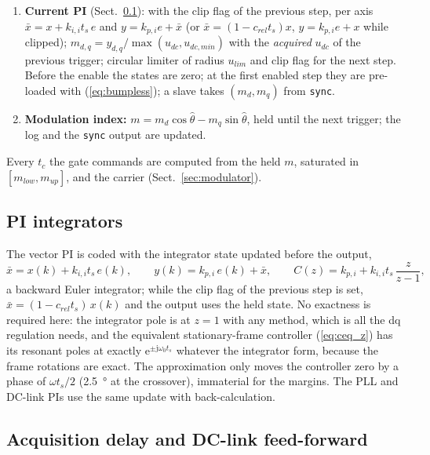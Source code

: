 \documentclass[10pt,a4paper]{scrartcl}
\newcommand{\ts}{t_s}
\newcommand{\tc}{t_c}
\newcommand{\wo}{\omega_0}
\newcommand{\kpi}{k_{p,i}}
\newcommand{\kii}{k_{i,i}}
\newcommand{\jj}{\mathrm{j}}
\newcommand{\ee}{\mathrm{e}}
\newcommand{\code}[1]{\texttt{#1}}
\begin{document}
\begin{onehalfspace}
\begin{enumerate}
\item \textbf{Current PI} (Sect.~\ref{sec:disc_pi}): with the clip flag of the previous step, per axis $\bar x = x + \kii\ts\,e$ and $y = \kpi e + \bar x$ (or $\bar x = (1 - c_{rel}\ts)x$, $y = \kpi e + x$ while clipped); $m_{d,q} = y_{d,q}/\max(u_{dc}, u_{dc,min})$ with the \emph{acquired} $u_{dc}$ of the previous trigger; circular limiter of radius $u_{lim}$ and clip flag for the next step. Before the enable the states are zero; at the first enabled step they are pre-loaded with (\ref{eq:bumpless}); a slave takes $(m_d, m_q)$ from \code{sync}.
\item \textbf{Modulation index:} $m = m_d\cos\hat\theta - m_q\sin\hat\theta$, held until the next trigger; the log and the \code{sync} output are updated.
\end{enumerate}
Every $\tc$ the gate commands are computed from the held $m$, saturated in $[m_{low}, m_{up}]$, and the carrier (Sect.~\ref{sec:modulator}).

\subsection{PI integrators}
\label{sec:disc_pi}

The vector PI is coded with the integrator state updated before the output,
\begin{equation}
\bar x = x(k) + \kii\ts\,e(k), \qquad y(k) = \kpi\,e(k) + \bar x, \qquad C(z) = \kpi + \kii\ts\,\frac{z}{z - 1},
\label{eq:pi_code}
\end{equation}
a backward Euler integrator; while the clip flag of the previous step is set, $\bar x = (1 - c_{rel}\ts)\,x(k)$ and the output uses the held state. No exactness is required here: the integrator pole is at $z = 1$ with any method, which is all the dq regulation needs, and the equivalent stationary-frame controller (\ref{eq:ceq_z}) has its resonant poles at exactly $\ee^{\pm\jj\wo\ts}$ whatever the integrator form, because the frame rotations are exact. The approximation only moves the controller zero by a phase of $\omega\ts/2$ (\SI{2.5}{\degree} at the crossover), immaterial for the margins. The PLL and DC-link PIs use the same update with back-calculation.

\subsection{Acquisition delay and DC-link feed-forward}
\label{sec:disc_ff}


\end{onehalfspace}
\end{document}
